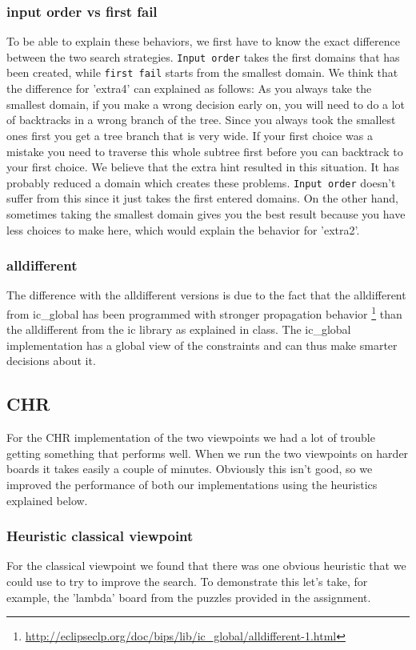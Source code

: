 \documentclass{report}
\begin{document}
\subsubsection{input order vs first fail}
To be able to explain these behaviors, we first have to know the exact difference between the two search strategies. \texttt{Input order} takes the first domains that has been created, while \texttt{first fail} starts from the smallest domain. We think that the difference for 'extra4' can explained as follows: As you always take the smallest domain, if you make a wrong decision early on, you will need to do a lot of backtracks in a wrong branch of the tree. Since you always took the smallest ones first you get a tree branch that is very wide. If your first choice was a mistake you need to traverse this whole subtree first before you can backtrack to your first choice. We believe that the extra hint resulted in this situation. It has probably reduced a domain which creates these problems. \texttt{Input order} doesn't suffer from this since it just takes the first entered domains. On the other hand, sometimes taking the smallest domain gives you the best result because you have less choices to make here, which would explain the behavior for 'extra2'.

\subsubsection{alldifferent}
The difference with the alldifferent versions is due to the fact that the alldifferent from ic\_global has been programmed with stronger propagation behavior \footnote{\url{http://eclipseclp.org/doc/bips/lib/ic\_global/alldifferent-1.html}} than the alldifferent from the ic library as explained in class. The ic\_global implementation has a global view of the constraints and can thus make smarter decisions about it.

\newpage
\subsection{CHR}
\label{sub:CHR}

For the CHR implementation of the two viewpoints we had a lot of trouble getting something that performs well. When we run the two viewpoints on harder boards it takes easily a couple of minutes. Obviously this isn't good, so we improved the performance of both our implementations using the heuristics explained below.

\subsubsection{Heuristic classical viewpoint}
For the classical viewpoint we found that there was one obvious heuristic that we could use to try to improve the search. To demonstrate this let's take, for example, the 'lambda' board from the puzzles provided in the assignment.
\end{document}

